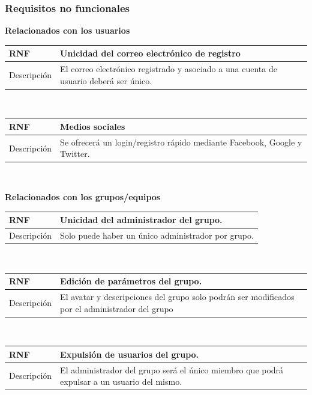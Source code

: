 \documentclass[twoside]{report}
\newcommand\addrow[2]{#1 &#2\\ }
\newcommand\addheading[2]{#1 &#2\\ \hline}
\newcommand\tabularhead{\begin{tabular}{lp{0.7\textwidth}}
\hline
}
\newenvironment{req}{\tabularhead}
{\hline\end{tabular}}
\begin{document}
\subsubsection{Requisitos no funcionales}



\textbf{Relacionados con los usuarios}\\

\begin{req}
	\addheading{\textbf{RNF\arabic{nonFunctionalRequirements}}}{Unicidad del correo electrónico de registro}
	\addrow{Descripción}{El correo electrónico registrado y asociado a una cuenta de usuario deberá ser único.}
\end{req}\\

\begin{req}
	\addheading{\textbf{RNF\arabic{nonFunctionalRequirements}}}{Medios sociales}
	\addrow{Descripción}{Se ofrecerá un login/registro rápido mediante Facebook, Google y Twitter.}
\end{req}\\

\textbf{Relacionados con los grupos/equipos}\\

\begin{req}
	\addheading{\textbf{RNF\arabic{nonFunctionalRequirements}}}{Unicidad del administrador del grupo.}
	\addrow{Descripción}{Solo puede haber un único administrador por grupo.}
\end{req}\\

\begin{req}
	\addheading{\textbf{RNF\arabic{nonFunctionalRequirements}}}{Edición de parámetros del grupo.}
	\addrow{Descripción}{El avatar y descripciones del grupo solo podrán ser modificados por el administrador del grupo}
\end{req}\\

\begin{req}
	\addheading{\textbf{RNF\arabic{nonFunctionalRequirements}}}{Expulsión de usuarios del grupo.}
	\addrow{Descripción}{El administrador del grupo será el único miembro que podrá expulsar a un usuario del mismo.}
\end{req}\\
\end{document}

